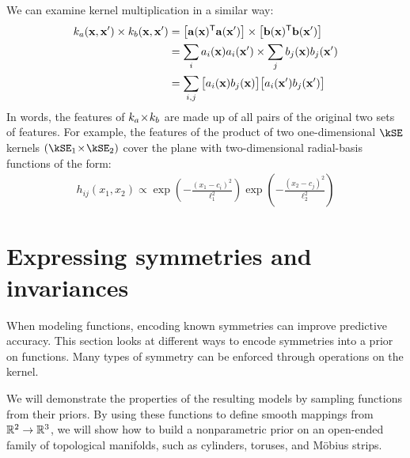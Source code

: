 We can examine kernel multiplication in a similar way:
%
\begin{align}
k_a({\bf{x}}, {\bf{x}}') \times k_b({\bf{x}}, {\bf{x}}')
& = \left[ {\bf{a}}({\bf{x}})^{\mathsf{T}} {\bf{a}}({\bf{x}}') \right] \times \left[ {\bf{b}}({\bf{x}})^{\mathsf{T}} {\bf{b}}({\bf{x}}') \right] \\
& = \sum_i a_i({\bf{x}}) a_i({\bf{x}}') \times \sum_j b_j({\bf{x}}) b_j({\bf{x}}') \\
& = \sum_{i,j} \big[ a_i({\bf{x}}) b_j({\bf{x}}) \big] \big[ a_i({\bf{x}}') b_j({\bf{x}}') \big]
\end{align}
%
In words, the features of $k_a \! \times \! k_b$ are made up of all pairs of the original two sets of features.
For example, the features of the product of two one-dimensional $\kSE$ kernels $(\kSE_1 \kerntimes \kSE_2)$ cover the plane with two-dimensional radial-basis functions of the form:
%
\begin{align}
h_{ij}(x_1, x_2) \propto \exp \left( -\frac{(x_1 - c_i)^2}{\ell_1^2} \right) \exp \left( -\frac{(x_2 - c_j)^2}{\ell_2^2} \right)
\end{align}





\section{Expressing symmetries and invariances}
\label{sec:expressing-symmetries}

\def\gswitch{G_\textnormal{swap}}

When modeling functions, encoding known symmetries can improve predictive accuracy. 
This section looks at different ways to encode symmetries into a prior on functions.
Many types of symmetry can be enforced through operations on the kernel.

We will demonstrate the properties of the resulting models by sampling functions from their priors.
By using these functions to define smooth mappings from $\mathbb{R}^2 \to \mathbb{R}^3$, we will show how to build a nonparametric prior on an open-ended family of topological manifolds, such as cylinders, toruses, and M\"{o}bius strips.

